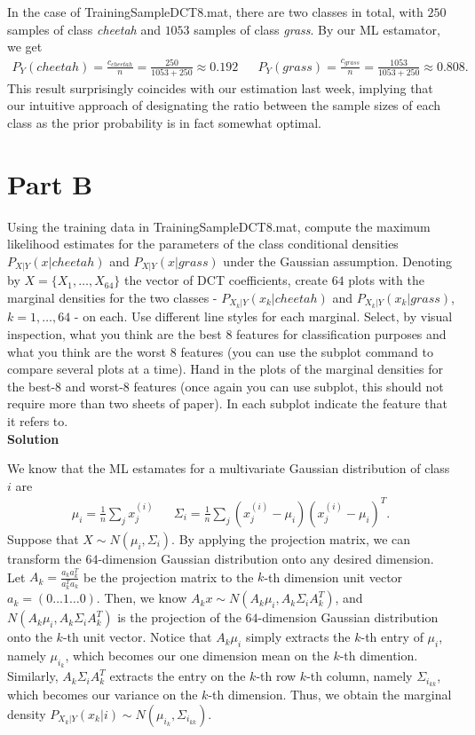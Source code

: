 \documentclass{article}
\begin{document}
In the case of {\selectfont TrainingSampleDCT\textunderscore8.mat}, there are two classes in total, with $250$ samples of class \textit{cheetah} and $1053$ samples of class \textit{grass}. By our ML estamator, we get
\begin{align*}
  P_Y(cheetah) = \frac{c_{cheetah}}{n} = \frac{250}{1053 + 250} \approx 0.192 && P_Y(grass) = \frac{c_{grass}}{n} = \frac{1053}{1053 + 250} \approx 0.808.
\end{align*}
This result surprisingly coincides with our estimation last week, implying that our intuitive approach of designating the ratio between the sample sizes of each class as the prior probability is in fact somewhat optimal.

\pagebreak

\section*{Part B}

Using the training data in {\selectfont TrainingSampleDCT\textunderscore8.mat}, compute the maximum likelihood estimates for the parameters of the class conditional densities $P_{X|Y}(x|cheetah)$ and $P_{X|Y}(x|grass)$ under the Gaussian assumption. Denoting by $X = \{X_1,\dots, X_{64}\}$ the vector of DCT coefficients, create $64$ plots with the marginal densities for the two classes - $P_{X_k|Y} (x_k|cheetah)$ and $P_{X_k|Y} (x_k|grass)$, $k = 1,\dots, 64$ - on each. Use different line styles for each marginal. Select, by visual inspection, what you think are the best $8$ features for classification purposes and what you think are the worst $8$ features (you can use the subplot command to compare several plots at a time). Hand in the plots of the marginal densities for the best-8 and worst-8 features (once again you can use subplot, this should not require more than two sheets of paper). In each subplot indicate the feature that it refers to. \\

\textbf{\large Solution}

We know that the ML estamates for a multivariate Gaussian distribution of class $i$ are
\begin{align*}
  \mu_i = \frac{1}{n}\sum_j x^{(i)}_j && \Sigma_i = \frac{1}{n}\sum_j (x^{(i)}_j - \mu_i)(x^{(i)}_j - \mu_i)^T.
\end{align*}
Suppose that $X \sim N(\mu_i, \Sigma_i)$. By applying the projection matrix, we can transform the $64$-dimension Gaussian distribution onto any desired dimension. Let $A_k = \frac{a_ka_k^T}{a_k^Ta_k}$ be the projection matrix to the $k$-th dimension unit vector $a_k = (0 \dots 1 \dots 0)$. Then, we know $A_kx \sim N(A_k\mu_i, A_k\Sigma_iA_k^T)$, and $N(A_k\mu_i, A_k\Sigma_iA_k^T)$ is the projection of the $64$-dimension Gaussian distribution onto the $k$-th unit vector. Notice that $A_k\mu_i$ simply extracts the $k$-th entry of $\mu_i$, namely $\mu_{i_k}$, which becomes our one dimension mean on the $k$-th dimention. Similarly, $A_k\Sigma_iA_k^T$ extracts the entry on the $k$-th row $k$-th column, namely $\Sigma_{i_{kk}}$, which becomes our variance on the $k$-th dimension. Thus, we obtain the marginal density $P_{X_k|Y}(x_k|i) \sim N(\mu_{i_k}, \Sigma_{i_{kk}})$.
\end{document}
